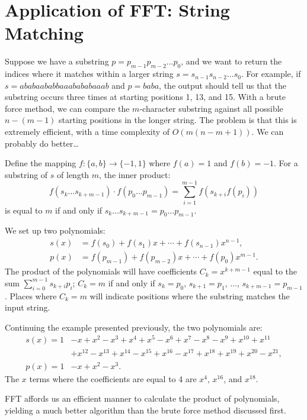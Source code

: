 \documentclass[11pt]{article}
\begin{document}
\section{Application of FFT: String Matching}
Suppose we have a substring $p = p_{m-1}p_{m-2}\dots p_0$, and we want to return the indices where it matches within a larger string $s = s_{n-1}s_{n-2}\dots s_0$. For example, if $s = ababaababbaaabababaaab$ and $p = baba$, the output should tell us that the substring occurs three times at starting positions 1, 13, and 15. With a brute force method, we can compare the $m$-character substring against all possible $n - (m-1)$ starting positions in the longer string. The problem is that this is extremely efficient, with a time complexity of $O(m(n-m + 1))$. We can probably do better\dots

Define the mapping $f: \{a, b\} \to \{-1, 1\}$ where $f(a) = 1$ and $f(b) = -1$. For a substring of $s$ of length $m$, the inner product:
\begin{equation*}
    f(s_k\dots s_{k+m-1})\cdot f(p_0 \dots p_{m-1}) = \sum_{i=1}^{m-1} f(s_{k+i}f(p_i))
\end{equation*}
is equal to $m$ if and only if $s_k \dots s_{k+m-1} = p_0 \dots p_{m-1}$.

We set up two polynomials:
\begin{align*}
    s(x) &= f(s_0) + f(s_1)x + \cdots + f(s_{n-1})x^{n-1}, \\
    p(x) &= f(p_{m-1}) + f(p_{m-2})x + \cdots + f(p_0)x^{m-1}.
\end{align*}
The product of the polynomials will have coefficients $C_k = x^{k+m-1}$ equal to the sum $\sum_{i=0}^{m-1} s_{k+i}p_i$; $C_k = m$ if and only if $s_k = p_0$, $s_{k+1} = p_1$, $\dots$, $s_{k+m-1} = p_{m-1}$. Places where $C_k = m$ will indicate positions where the substring matches the input string.

Continuing the example presented previously, the two polynomials are:
\begin{align*}
    s(x) = 1 &- x + x^2 - x^3 + x^4 + x^5 - x^6 + x^7 - x^8 - x^9 + x^{10} + x^{11} \\
             & + x^{12} - x^{13} + x^{14} - x^{15} + x^{16} - x^{17} + x^{18} + x^{19} + x^{20} - x^{21}, \\
    p(x) = 1 &- x + x^2 - x^3.
\end{align*}
The $x$ terms where the coefficients are equal to 4 are $x^4$, $x^{16}$, and $x^{18}$. 

FFT affords us an efficient manner to calculate the product of polynomials, yielding a much better algorithm than the brute force method discussed first. 
\end{document}
